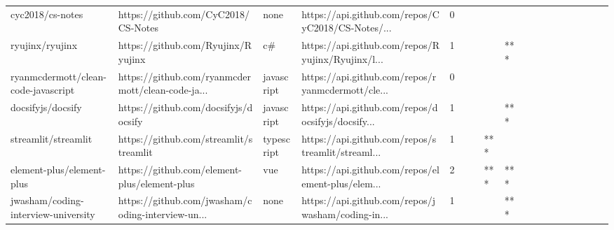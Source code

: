 \begin{tabular}{llllrlllllllllllll}
cyc2018/cs-notes                                   &                https://github.com/CyC2018/CS-Notes &              none &  https://api.github.com/repos/CyC2018/CS-Notes/... &       0 &         &        &           &                &                 &        &           &           &          &          &       &              &          \\
ryujinx/ryujinx                                    &                 https://github.com/Ryujinx/Ryujinx &                c\# &  https://api.github.com/repos/Ryujinx/Ryujinx/l... &       1 &         &        &           &            *** &                 &        &           &           &          &          &       &              &          \\
ryanmcdermott/clean-code-javascript                &  https://github.com/ryanmcdermott/clean-code-ja... &        javascript &  https://api.github.com/repos/ryanmcdermott/cle... &       0 &         &        &           &                &                 &        &           &           &          &          &       &              &          \\
docsifyjs/docsify                                  &               https://github.com/docsifyjs/docsify &        javascript &  https://api.github.com/repos/docsifyjs/docsify... &       1 &         &        &           &            *** &                 &        &           &           &          &          &       &              &          \\
streamlit/streamlit                                &             https://github.com/streamlit/streamlit &        typescript &  https://api.github.com/repos/streamlit/streaml... &       1 &         &        &       *** &                &                 &        &           &           &          &          &       &              &          \\
element-plus/element-plus                          &       https://github.com/element-plus/element-plus &               vue &  https://api.github.com/repos/element-plus/elem... &       2 &         &        &       *** &            *** &                 &        &           &           &          &          &       &              &          \\
jwasham/coding-interview-university                &  https://github.com/jwasham/coding-interview-un... &              none &  https://api.github.com/repos/jwasham/coding-in... &       1 &         &        &           &            *** &                 &        &           &           &          &          &       &              &          \\

\end{tabular}
